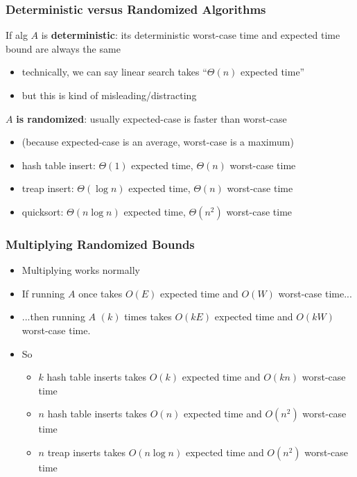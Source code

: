 \documentclass[10pt]{beamer}
\begin{document}
\begin{frame} \frametitle{Deterministic versus Randomized Algorithms}
If alg $A$ is \textbf{deterministic}: its deterministic worst-case time
and expected time bound are always the same
\begin{itemize}
  \item technically, we can say linear search takes ``$\Theta(n)$ expected time''
  \item but this is kind of misleading/distracting
\end{itemize}
$A$ \textbf{is randomized}: usually expected-case is faster than worst-case
\begin{itemize}
  \item (because expected-case is an average, worst-case is a maximum)
  \item hash table insert: $\Theta(1)$ expected time, $\Theta(n)$ worst-case time
  \item treap insert: $\Theta(\log n)$ expected time, $\Theta(n)$ worst-case time
  \item quicksort: $\Theta(n \log n)$ expected time, $\Theta(n^2)$ worst-case time
\end{itemize}
\end{frame}

\begin{frame} \frametitle{Multiplying Randomized Bounds}
\begin{itemize}
  \item Multiplying works normally
  \item If running $A$ once takes $O(E)$ expected time and $O(W)$ worst-case time...
  \item ...then running $A$ $(k)$ times takes $O(kE)$ expected time and $O(kW)$ worst-case time.
  \item So
  \begin{itemize}
    \item $k$ hash table inserts takes $O(k)$ expected time and $O(kn)$ worst-case time
    \item $n$ hash table inserts takes $O(n)$ expected time and $O(n^2)$ worst-case time
    \item $n$ treap inserts takes $O(n \log n)$ expected time and $O(n^2)$ worst-case time
  \end{itemize}
\end{itemize}

\end{frame}
\end{document}
